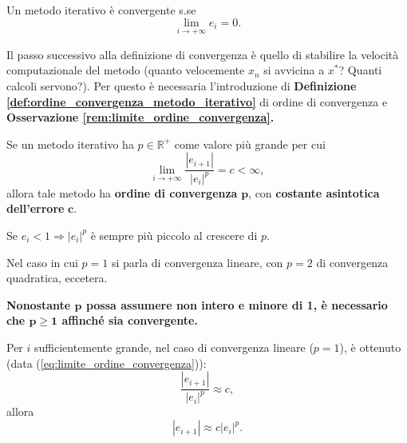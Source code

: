 \begin{definition}
	Un metodo iterativo è convergente s.se \begin{equation}\label{eq:limite_errore_metodo_convergente}
		\lim_{i\to+\infty}{e_i}=0.
	\end{equation}
\end{definition}

Il passo successivo alla definizione di convergenza è quello di stabilire la velocità computazionale del metodo (quanto velocemente $x_n$ si avvicina a $x^*$? Quanti calcoli servono?). Per questo è necessaria l'introduzione di \textbf{Definizione \ref{def:ordine_convergenza_metodo_iterativo}} di ordine di convergenza e \textbf{Osservazione \ref{rem:limite_ordine_convergenza}.}
\begin{definition} \label{def:ordine_convergenza_metodo_iterativo}
	Se un metodo iterativo ha $p\in\mathbb R^+$ come valore più grande per cui
	 \begin{equation}\label{eq:limite_ordine_convergenza}
		\lim_{i\to + \infty}{\frac{|e_{i+1}|}{|e_i|^p}}=c<\infty,
	\end{equation}
	allora tale metodo ha \textbf{ordine di convergenza} $\boldsymbol p$, con \textbf{costante asintotica dell'errore} $\boldsymbol c$.
\end{definition}

\begin{remark}
	Se $e_i<1 \Rightarrow |e_i|^p$ è sempre più piccolo al crescere di $p$.
\end{remark}

Nel caso in cui $p=1$ si parla di convergenza lineare, con $p = 2$ di convergenza quadratica, eccetera. 

\textbf{Nonostante $\boldsymbol p$ possa assumere non intero e minore di 1, è necessario che $\boldsymbol{p \geq 1}$ affinché sia convergente.}

\begin{remark}\label{rem:limite_ordine_convergenza}
	Per $i$ sufficientemente grande, nel caso di convergenza lineare ($p=1$), è ottenuto (data (\ref{eq:limite_ordine_convergenza})):
	\begin{equation*}
		\frac{|e_{i+1}|}{|e_i|^p}\approx c,
	\end{equation*}
	allora
	\begin{equation}\label{eq:approssimazione_errore_i+1}
		|e_{i+1}|\approx c|e_i|^p.
	\end{equation}
\end{remark}

